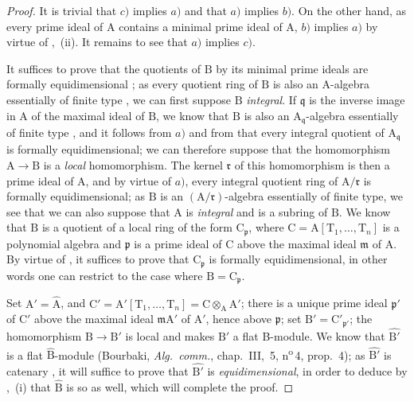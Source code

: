 \begin{proof}
It is trivial that $c)$ implies $a)$ and that $a)$ implies $b)$.
On the other hand, as every prime ideal of $\mathrm{A}$ contains a minimal prime ideal of $\mathrm{A}$, $b)$ implies $a)$ by virtue of ,~(ii).
It remains to see that $a)$ implies $c)$.

It suffices to prove that the quotients of $\mathrm{B}$ by its minimal prime ideals are formally equidimensional ; as every quotient ring of $\mathrm{B}$ is also an A-algebra essentially of finite type , we can first suppose $\mathrm{B}$ \emph{integral}.
If $\mathfrak{q}$ is the inverse image in $\mathrm{A}$ of the maximal ideal of $\mathrm{B}$, we know that $\mathrm{B}$ is also an $\mathrm{A}_\mathfrak{q}$-algebra essentially of finite type , and it follows from $a)$ and from  that every integral quotient of $\mathrm{A}_\mathfrak{q}$ is formally equidimensional; we can therefore suppose that the homomorphism $\mathrm{A}\to\mathrm{B}$ is a \emph{local} homomorphism.
The kernel $\mathfrak{r}$ of this homomorphism is then a prime ideal of $\mathrm{A}$, and by virtue of $a)$, every integral quotient ring of $\mathrm{A}/\mathfrak{r}$ is formally equidimensional; as $\mathrm{B}$ is an $(\mathrm{A}/\mathfrak{r})$-algebra essentially of finite type, we see that we can also suppose
that $\mathrm{A}$ is \emph{integral} and is a subring of $\mathrm{B}$.
We know  that $\mathrm{B}$ is a quotient of a local ring of the form $\mathrm{C}_\mathfrak{p}$, where $\mathrm{C}=\mathrm{A}[\mathrm{T}_1,\ldots,\mathrm{T}_n]$ is a polynomial algebra and $\mathfrak{p}$ is a prime ideal of $\mathrm{C}$ above the maximal ideal $\mathfrak{m}$ of $\mathrm{A}$.
By virtue of , it suffices to prove that $\mathrm{C}_\mathfrak{p}$ is formally equidimensional, in other words one can restrict to the case where $\mathrm{B}=\mathrm{C}_\mathfrak{p}$.

Set $\mathrm{A}'=\widehat{\mathrm{A}}$, and $\mathrm{C}'=\mathrm{A}'[\mathrm{T}_1,\ldots,\mathrm{T}_n]=\mathrm{C}\otimes_\mathrm{A}\mathrm{A}'$; there is a unique prime ideal $\mathfrak{p}'$ of $\mathrm{C}'$ above the maximal ideal $\mathfrak{m}\mathrm{A}'$ of $\mathrm{A}'$, hence above $\mathfrak{p}$; set $\mathrm{B}'=\mathrm{C}'_{\mathfrak{p}'}$; the homomorphism $\mathrm{B}\to\mathrm{B}'$ is local and makes $\mathrm{B}'$ a flat B-module.
We know that $\widehat{\mathrm{B}'}$ is a flat $\widehat{\mathrm{B}}$-module (Bourbaki, \emph{Alg.\ comm.}, chap.~III, \textsection\,5, n\textsuperscript{o}\,4, prop.~4); as $\widehat{\mathrm{B}'}$ is catenary , it will suffice to prove that $\widehat{\mathrm{B}'}$ is \emph{equidimensional}, in order to deduce by ,~(i) that $\widehat{\mathrm{B}}$ is so as well, which will complete the proof.


\end{proof}

